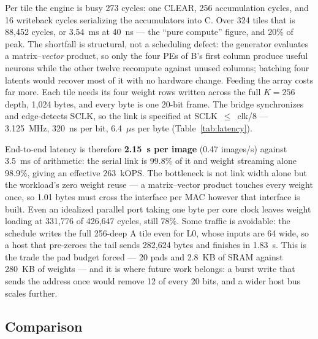 \documentclass[conference,a4paper]{APSIPA2026}
\begin{document}
Per tile the engine is busy 273 cycles: one CLEAR, 256 accumulation cycles, and 16 writeback cycles serializing the accumulators into C. Over 324 tiles that is 88{,}452 cycles, or 3.54~ms at 40~ns --- the ``pure compute'' figure, and 20\% of peak. The shortfall is structural, not a scheduling defect: the generator evaluates a matrix--\emph{vector} product, so only the four PEs of B's first column produce useful neurons while the other twelve recompute against unused columns; batching four latents would recover most of it with no hardware change. Feeding the array costs far more. Each tile needs its four weight rows written across the full $K=256$ depth, 1{,}024 bytes, and every byte is one 20-bit frame. The bridge synchronizes and edge-detects SCLK, so the link is specified at SCLK~$\leq$~clk/8 --- 3.125~MHz, 320~ns per bit, 6.4~$\mu$s per byte (Table~\ref{tab:latency}).

End-to-end latency is therefore \textbf{2.15~s per image} (0.47 images/s) against 3.5~ms of arithmetic: the serial link is 99.8\% of it and weight streaming alone 98.9\%, giving an effective 263~kOPS. The bottleneck is not link width alone but the workload's zero weight reuse --- a matrix--vector product touches every weight once, so 1.01 bytes must cross the interface per MAC however that interface is built. Even an idealized parallel port taking one byte per core clock leaves weight loading at 331{,}776 of 426{,}647 cycles, still 78\%. Some traffic is avoidable: the schedule writes the full 256-deep A tile even for L0, whose inputs are 64 wide, so a host that pre-zeroes the tail sends 282{,}624 bytes and finishes in 1.83~s. This is the trade the pad budget forced --- 20 pads and 2.8~KB of SRAM against 280~KB of weights --- and it is where future work belongs: a burst write that sends the address once would remove 12 of every 20 bits, and a wider host bus scales further.

\subsection{Comparison}
\end{document}
